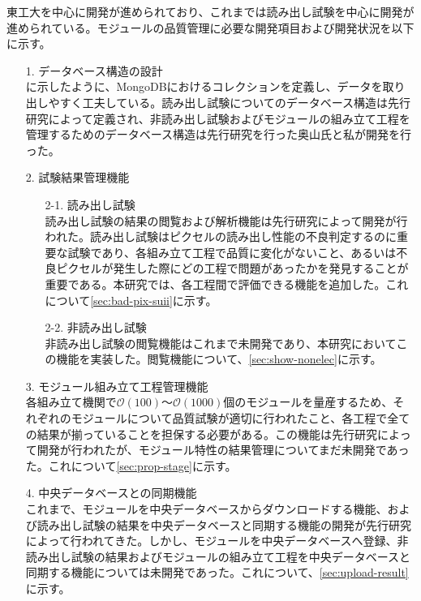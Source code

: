 東工大を中心に開発が進められており、これまでは読み出し試験を中心に開発が進められている。モジュールの品質管理に必要な開発項目および開発状況を以下に示す。
\begin{itemize}
  \item[1.] データベース構造の設計 \\
  に示したように、MongoDBにおけるコレクションを定義し、データを取り出しやすく工夫している。読み出し試験についてのデータベース構造は先行研究\cite{kimu,kubotan}によって定義され、非読み出し試験およびモジュールの組み立て工程を管理するためのデータベース構造は先行研究\cite{oku}を行った奥山氏と私が開発を行った。
  \item[2.] 試験結果管理機能
  \begin{itemize}
    \item[2-1.] 読み出し試験 \\
    読み出し試験の結果の閲覧および解析機能は先行研究\cite{oku,kubotan}によって開発が行われた。読み出し試験はピクセルの読み出し性能の不良判定するのに重要な試験であり、各組み立て工程で品質に変化がないこと、あるいは不良ピクセルが発生した際にどの工程で問題があったかを発見することが重要である。本研究では、各工程間で評価できる機能を追加した。これについて\ref{sec:bad-pix-suii}に示す。
    \item[2-2.] 非読み出し試験 \\
    非読み出し試験の閲覧機能はこれまで未開発であり、本研究においてこの機能を実装した。閲覧機能について、\ref{sec:show-nonelec}に示す。
  \end{itemize}
  \item[3.] モジュール組み立て工程管理機能 \\
  各組み立て機関で$\mathcal{O}(100)$〜$\mathcal{O}(1000)$個のモジュールを量産するため、それぞれのモジュールについて品質試験が適切に行われたこと、各工程で全ての結果が揃っていることを担保する必要がある。この機能は先行研究\cite{oku}によって開発が行われたが、モジュール特性の結果管理についてまだ未開発であった。これについて\ref{sec:prop-stage}に示す。
  \item[4.] 中央データベースとの同期機能 \\
  これまで、モジュールを中央データベースからダウンロードする機能、および読み出し試験の結果を中央データベースと同期する機能の開発が先行研究\cite{oku}によって行われてきた。しかし、モジュールを中央データベースへ登録、非読み出し試験の結果およびモジュールの組み立て工程を中央データベースと同期する機能については未開発であった。これについて、\ref{sec:upload-result}に示す。
\end{itemize}






\newpage
